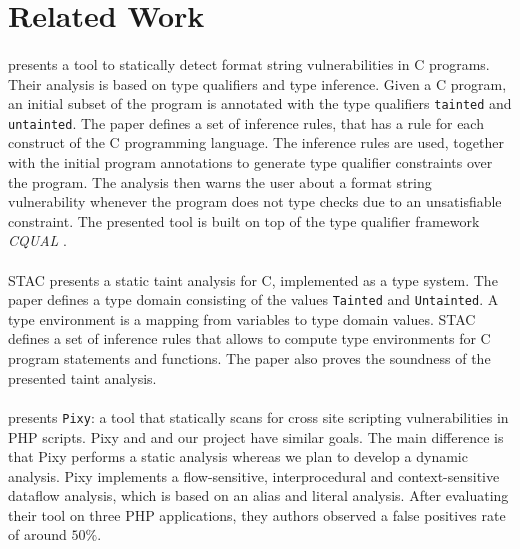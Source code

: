 \section{Related Work}\label{sec:related}

\paragraph{\cite{Shankar:2001:DFS}} presents a tool to statically
detect format string vulnerabilities in C programs. Their analysis
is based on type qualifiers and type inference. Given a C program,
an initial subset of the program is annotated with the type qualifiers
\texttt{tainted} and \texttt{untainted}. The paper defines a set
of inference rules, that has a rule for each construct of
the C programming language. The inference rules are used, together
with the initial program annotations to generate type qualifier
constraints over the program. The analysis then warns the user
about a format string vulnerability whenever the program does not
type checks due to an unsatisfiable constraint. The presented tool
is built on top of the type qualifier framework \textit{CQUAL} 
\cite{Foster:pldi99}.

\paragraph{\cite{Dimitru:2009:STAC}} STAC presents a static taint
analysis for C, implemented as a type system. The paper defines a type
domain consisting of the values \texttt{Tainted} and \texttt{Untainted}.
A type environment is a mapping from variables to type domain values.
STAC defines a set of inference rules that allows to compute
type environments for C program statements and functions. The paper
also proves the soundness of the presented taint analysis.

\paragraph{\cite{Jovanovic:2006:Pixy}} presents \texttt{Pixy}: a tool
that statically scans for cross site scripting vulnerabilities in PHP
scripts. Pixy and and our project have similar goals. The main
difference is that Pixy performs a static analysis whereas we plan
to develop a dynamic analysis. Pixy implements a flow-sensitive,
interprocedural and context-sensitive dataflow analysis, which
is based on an alias and literal analysis. After evaluating
their tool on three PHP applications, they authors observed 
a false positives rate of around $50\%$.

